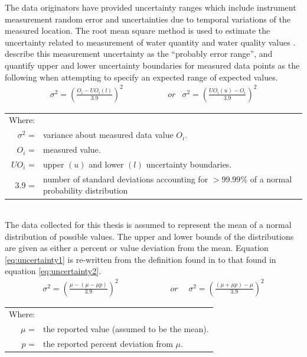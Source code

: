 The data originators have provided uncertainty ranges which include instrument measurement random error and uncertainties due to temporal variations of the measured location.  The root mean square method is used to estimate the uncertainty related to measurement of water quantity and water quality values \parencite{harmel2007, gum2008}.  \textcite{harmel2007} describe this measurement uncertainty as the “probably error range”, and quantify upper and lower uncertainty boundaries for measured data points as the following when attempting to specify an expected range of expected values.
\begin{align}
	\sigma^2 = \left( \frac{O_i-UO_{i}(l)}{3.9} \right)^2  &  \phantom{xxxxxxxx} or  & 	\sigma^2 = \left( \frac{UO_{i}(u)-O_i}{3.9} \right)^2 \label{eq:uncertainty1}
\end{align}
\begin{tabular}{r p{5.5in}}
	Where:\\
	$ \sigma^2 $ = & variance about measured data value $ O_i $.\\
	$ O_i $ = & measured value.\\
	$ UO_i $ = & upper $ (u) $ and lower $ (l) $ uncertainty boundaries.\\
	$ 3.9 $ = & number of standard deviations accounting for $ >99.99 $\% of a normal probability distribution
\end{tabular}\\

The data collected for this thesis is assumed to represent the mean of a normal distribution of possible values.  The upper and lower bounds of the distributions are given as either a percent or value deviation from the mean.  Equation \ref{eq:uncertainty1} is re-written from the definition found in \textcite{harmel2007} to that found in equation \ref{eq:uncertainty2}.
\begin{align}
	\sigma^2 = \left( \frac{\mu - (\mu - \mu p)}{3.9} \right)^2  &  \phantom{wordsssssss} or \phantom{s}  & 	\sigma^2 = \left( \frac{(\mu + \mu p) - \mu}{3.9} \right)^2 \label{eq:uncertainty2}
\end{align}

\begin{tabular}{r p{5.5in}}
	Where:\\
	$ \mu $ = & the reported value (assumed to be the mean).\\
	$ p $ = & the reported percent deviation from $ \mu $.\\
\end{tabular}\\

